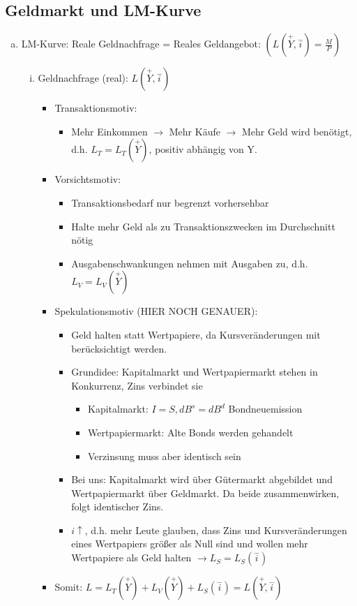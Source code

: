 \documentclass{scrartcl}
\begin{document}
\subsection{Geldmarkt und LM-Kurve}
\begin{enumerate}[(a)]
    \item LM-Kurve: Reale Geldnachfrage = Reales Geldangebot: $(L(\overset{+}{Y},\overset{-}{i})=\frac{M}{P})$
    \begin{enumerate}[(i)]
    \item Geldnachfrage (real): $L(\overset{+}{Y},\overset{-}{i})$
    \begin{itemize}
      \item Transaktionsmotiv:
      \begin{itemize}
      \item Mehr Einkommen $\rightarrow$ Mehr K\"{a}ufe $\rightarrow$ Mehr Geld wird ben\"{o}tigt, d.h. $L_T=L_T(\overset{+}{Y})$, positiv abh\"{a}ngig von Y.
      \end{itemize}
      \item Vorsichtsmotiv:
      \begin{itemize}
      \item Transaktionsbedarf nur begrenzt vorhersehbar
      \item Halte mehr Geld als zu Transaktionszwecken im Durchschnitt n\"{o}tig
      \item Ausgabenschwankungen nehmen mit Ausgaben zu, d.h. $L_V=L_V(\overset{+}{Y})$
      \end{itemize}
      \item Spekulationsmotiv (HIER NOCH GENAUER):
        \begin{itemize}
          \item Geld halten statt Wertpapiere, da Kursver\"{a}nderungen mit ber\"{u}cksichtigt werden.
          \item Grundidee: Kapitalmarkt und Wertpapiermarkt stehen in Konkurrenz, Zins verbindet sie
          \begin{itemize}
          \item Kapitalmarkt: $I=S, dB^s=dB^d$ Bondneuemission
          \item Wertpapiermarkt: Alte Bonds werden gehandelt
          \item Verzinsung muss aber identisch sein
          \end{itemize}
          \item Bei uns: Kapitalmarkt wird \"{u}ber G\"{u}termarkt abgebildet und Wertpapiermarkt \"{u}ber Geldmarkt. Da beide zusammenwirken, folgt identischer Zins.
          \item $i\uparrow$, d.h. mehr Leute glauben, dass Zins und Kursver\"{a}nderungen eines Wertpapiers gr\"{o}{\ss}er als Null sind und wollen mehr Wertpapiere als Geld halten $\rightarrow L_S=L_S(\overset{-}{i})$
        \end{itemize}
        \item Somit: $L = L_T(\overset{+}{Y})+L_V(\overset{+}{Y})+L_S(\overset{-}{i}) = L(\overset{+}{Y},\overset{-}{i})$
    \end{itemize}


\end{enumerate}
\end{enumerate}
\end{document}
